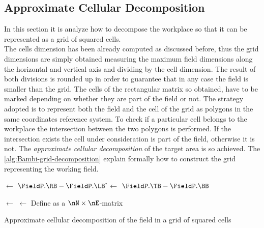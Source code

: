 \subsection{Approximate Cellular Decomposition} %
\label{sub:approximate_cellular_decomposition}
In this section it is analyze how to decompose the workplace so that it can be represented as a grid of squared cells.\\
The cells dimension has been already computed as discussed before, thus the grid dimensions are simply obtained measuring the maximum field dimensions along the horizontal and vertical axis and dividing by the cell dimension. The result of both divisions is rounded up in order to guarantee that in any case the field is smaller than the grid. The cells of the rectangular matrix so obtained, have to be marked depending on whether they are part of the field or not. The strategy adopted is to represent both the field and the cell of the grid as polygons in the same coordinates reference system. To check if a particular cell belongs to the workplace the intersection between the two polygons is performed. If the intersection exists the cell under consideration is part of the field, otherwise it is not. The \textit{approximate cellular decomposition} of the target area is so achieved. The \autoref{alg:Bambi-grid-decomposition} explain formally how to construct the grid representing the working field.
\begin{algorithm}[tbh]
	
	\BlankLine
	
	\w $\leftarrow$ $\FieldP.\RB - \FieldP.\LB$ \;
	\h $\leftarrow$ $\FieldP.\TB - \FieldP.\BB$ \;

	\nE $\leftarrow$ \Ceil{$\w / \l$} \;
	\nN $\leftarrow$ \Ceil{$\h / \l$} \;
	Define \Matrix as a $\nN\times\nE$-matrix\;
\caption{Approximate cellular decomposition of the field in a grid of squared cells}
\label{alg:Bambi-grid-decomposition}
\end{algorithm}
